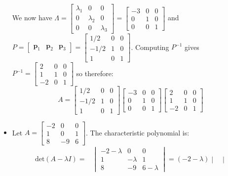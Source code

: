\documentclass{article}
\begin{document}
\begin{itemize}
We now have \(\Lambda = \begin{bmatrix} \lambda_1 & 0 & 0 \\ 0 & \lambda_2 & 0 \\ 0 & 0 & \lambda_3 \end{bmatrix} = \begin{bmatrix} -3 & 0 & 0 \\ 0 & 1 & 0 \\ 0 & 0 & 1 \end{bmatrix}\) and \(P = \begin{bmatrix} \mathbf{p}_1 & \mathbf{p}_2 & \mathbf{p}_3 \end{bmatrix} = \begin{bmatrix} 1/2 & 0 & 0 \\ -1/2 & 1 & 0 \\ 1 & 0 & 1 \end{bmatrix}\). Computing \(P^{-1}\) gives \(P^{-1} = \begin{bmatrix} 2 & 0 & 0 \\ 1 & 1 & 0 \\ -2 & 0 & 1 \end{bmatrix}\) so therefore: 
\[A = \begin{bmatrix} 1/2 & 0 & 0 \\ -1/2 & 1 & 0 \\ 1 & 0 & 1 \end{bmatrix}\begin{bmatrix} -3 & 0 & 0 \\ 0 & 1 & 0 \\ 0 & 0 & 1 \end{bmatrix}\begin{bmatrix} 2 & 0 & 0 \\ 1 & 1 & 0 \\ -2 & 0 & 1 \end{bmatrix}\]
\item Let \(A = \begin{bmatrix} -2 & 0 & 0 \\ 1 & 0 & 1 \\ 8 & -9 & 6 \end{bmatrix}\). The characteristic polynomial is:
\begin{align*}
\text{det}(A - \lambda I) = & \begin{vmatrix}
-2 - \lambda & 0 & 0 \\ 
1 & -\lambda & 1 \\ 
8 & -9 & 6 - \lambda
\end{vmatrix} = (-2 - \lambda)\begin{vmatrix}

\end{vmatrix}
\end{align*}
\end{itemize}
\end{document}
